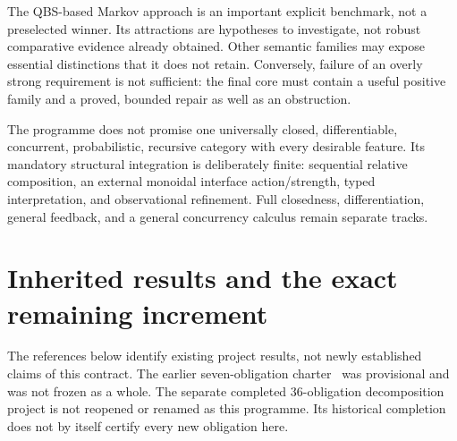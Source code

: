 \documentclass[11pt,a4paper]{article}
\begin{document}
The QBS-based Markov approach is an important explicit benchmark, not a
preselected winner. Its attractions are hypotheses to investigate, not robust
comparative evidence already obtained. Other semantic families may expose
essential distinctions that it does not retain. Conversely, failure of an
overly strong requirement is not sufficient: the final core must contain a
useful positive family and a proved, bounded repair as well as an obstruction.

The programme does not promise one universally closed, differentiable,
concurrent, probabilistic, recursive category with every desirable feature.
Its mandatory structural integration is deliberately finite: sequential
relative composition, an external monoidal interface action/strength, typed
interpretation, and observational refinement. Full closedness, differentiation,
general feedback, and a general concurrency calculus remain separate tracks.

\section{Inherited results and the exact remaining increment}\label{sec:inherited}

The references below identify existing project results, not newly established
claims of this contract. The earlier seven-obligation charter~\cite{Charter} was provisional
and was not frozen as a whole. The separate completed 36-obligation
decomposition project is not reopened or renamed as this programme. Its
historical completion does not by itself certify every new obligation here.
\end{document}

